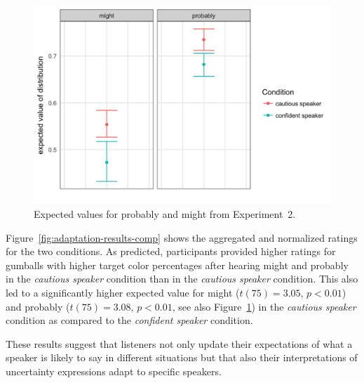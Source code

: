 \documentclass[lucida,biblatex]{sp} %
\begin{document}
\begin{figure}
\includegraphics[width=.75\textwidth]{plots/adaptation-diff-comprehension.png}
\caption{Expected values for {\sc probably} and {\sc might} from Experiment~2.  \label{fig:adaptation-exp-comp}}
\end{figure}


Figure~\ref{fig:adaptation-results-comp} shows the aggregated and normalized ratings for the two conditions.  As predicted, participants provided higher ratings for gumballs with higher target color percentages after hearing {\sc might} and {\sc probably} in the \emph{cautious speaker} condition than in the \emph{cautious speaker} condition. This also led to a significantly higher expected value for {\sc might} ($t(75)=3.05$, $p<0.01$) and {\sc probably} ($t(75)=3.08$, $p<0.01$, see also Figure~\ref{fig:adaptation-exp-comp}) in the \emph{cautious speaker} condition as compared to the \emph{confident speaker} condition.

These results suggest that listeners not only update their expectations of what a speaker is likely to say in different situations but that also their interpretations of uncertainty expressions adapt to specific speakers.
\end{document}
